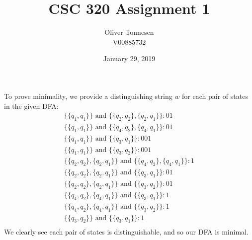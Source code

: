 \documentclass{article}
\title{CSC 320 Assignment 1}
\author{Oliver Tonnesen\\V00885732}
\date{January 29, 2019}
\begin{document}
\maketitle
\renewcommand{\thesubsection}{\thesection.\alph{subsection}}
\section{} %
\subsection{} %
\begin{minipage}{\textwidth}

\end{minipage}
\subsection{} %
\begin{minipage}{\textwidth}

\end{minipage}
\subsection{} %
\begin{minipage}{\textwidth}

\end{minipage}
\subsection{} %
\begin{minipage}{\textwidth}

\end{minipage}
\newline
To prove minimality, we provide a distinguishing string $w$ for each pair of
states in the given DFA:
\begin{align*}
	\{\{q_1,q_1\}\}\text{ and }\{\{q_2,q_2\},\{q_2,q_1\}\}: 01\\
	\{\{q_1,q_1\}\}\text{ and }\{\{q_4,q_2\},\{q_4,q_1\}\}: 01\\
	\{\{q_1,q_1\}\}\text{ and }\{\{q_3,q_1\}\}: 001\\
	\{\{q_1,q_1\}\}\text{ and }\{\{q_3,q_2\}\}: 001\\
	\{\{q_2,q_2\},\{q_2,q_1\}\}\text{ and }\{\{q_4,q_2\},\{q_4,q_1\}\}: 1\\
	\{\{q_2,q_2\},\{q_2,q_1\}\}\text{ and }\{\{q_3,q_1\}\}: 01\\
	\{\{q_2,q_2\},\{q_2,q_1\}\}\text{ and }\{\{q_3,q_2\}\}: 01\\
	\{\{q_4,q_2\},\{q_4,q_1\}\}\text{ and }\{\{q_3,q_1\}\}: 1\\
	\{\{q_4,q_2\},\{q_4,q_1\}\}\text{ and }\{\{q_3,q_2\}\}: 1\\
	\{\{q_3,q_2\}\}\text{ and }\{\{q_3,q_1\}\}: 1\\
\end{align*}
We clearly see each pair of states is distinguishable, and so our DFA is minimal.
\end{document}
